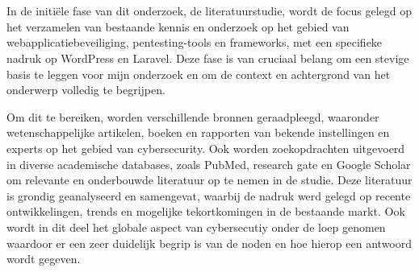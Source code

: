
\chapter{}%
\label{ch:methodologie}


In de initiële fase van dit onderzoek, de literatuurstudie, wordt de focus gelegd op het verzamelen van bestaande kennis 
en onderzoek op het gebied van webapplicatiebeveiliging, pentesting-tools en frameworks, met een specifieke nadruk op 
WordPress en Laravel. Deze fase is van cruciaal 
belang om een stevige basis te leggen voor mijn onderzoek en om de context en achtergrond van het onderwerp volledig te 
begrijpen.

Om dit te bereiken, worden verschillende bronnen geraadpleegd, waaronder wetenschappelijke artikelen, boeken  
en rapporten van bekende instellingen en experts op het gebied van cybersecurity. 
Ook worden zoekopdrachten uitgevoerd in diverse academische databases, zoals PubMed, research gate en 
Google Scholar om relevante en onderbouwde literatuur op te nemen in de studie. Deze literatuur is grondig geanalyseerd en 
samengevat, waarbij de nadruk werd gelegd op recente ontwikkelingen, trends en mogelijke tekortkomingen in de bestaande markt.
Ook wordt in dit deel het globale aspect van cybersecutiy onder de loep genomen waardoor er een zeer duidelijk begrip 
is van de noden en hoe hierop een antwoord wordt gegeven.

